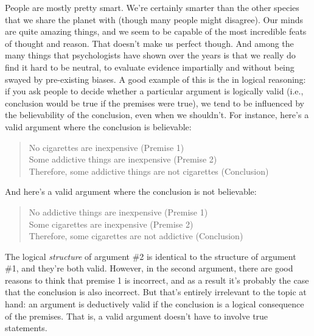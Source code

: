 
People are mostly pretty smart. We're certainly smarter than the other species that we share the planet with (though many people might disagree). Our minds are quite amazing things, and we seem to be capable of the most incredible feats of thought and reason. That doesn't make us perfect though. And among the many things that psychologists have shown over the years is that we really do find it hard to be neutral, to evaluate evidence impartially and without being swayed by pre-existing biases. A good example of this is the  in logical reasoning: if you ask people to decide whether a particular argument is logically valid (i.e., conclusion would be true if the premises were true), we tend to be influenced by the believability of the conclusion, even when we shouldn't. For instance, here's a valid argument where the conclusion is believable:
\begin{quote}
No cigarettes are inexpensive (Premise 1) \\
Some addictive things are inexpensive (Premise 2)\\
Therefore, some addictive things are not cigarettes (Conclusion)
\end{quote}
And here's a valid argument where the conclusion is not believable:
\begin{quote}
No addictive things are inexpensive (Premise 1)\\
Some cigarettes are inexpensive (Premise 2)\\
Therefore, some cigarettes are not addictive (Conclusion)
\end{quote}
The logical {\it structure} of argument \#2 is identical to the structure of argument \#1, and they're both valid. However, in the second argument, there are good reasons to think that premise 1 is incorrect, and as a result it's probably the case that the conclusion is also incorrect. But that's entirely irrelevant to the topic at hand: an argument is deductively valid if the conclusion is a logical consequence of the premises. That is, a valid argument doesn't have to involve true statements.

